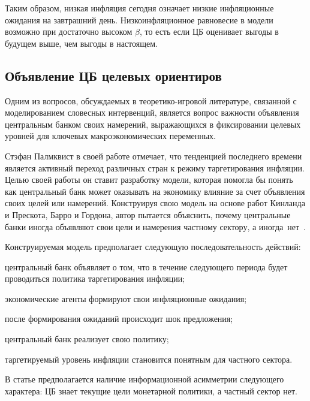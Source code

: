 \documentclass[14pt,a4paper, oneside]{extreport}
\renewenvironment{itemize}%
{\begin{list}{--} {%
\setlength{\parsep}{0em}%
\setlength{\itemsep}{0em}%
\setlength{\topsep}{0em}%
\setlength{\parskip}{0em}
}}%
{\end{list}}
\theoremstyle{plain}              %
\theoremstyle{definition}         %
\begin{document}
Таким образом, низкая инфляция сегодня означает низкие инфляционные ожидания на завтрашний день. Низкоинфляционное равновесие в модели возможно при достаточно высоком $\beta$, то есть если ЦБ оценивает выгоды в будущем выше, чем выгоды в настоящем. 

\subsection{Объявление ЦБ целевых ориентиров} 
Одним из вопросов, обсуждаемых в теоретико-игровой литературе, связанной с моделированием словесных интервенций, является вопрос важности объявления центральным банком своих намерений, выражающихся в фиксировании целевых уровней для ключевых макроэкономических переменных.   
  
Стэфан Палмквист в своей работе отмечает, что тенденцией последнего времени является активный переход различных стран к режиму таргетирования инфляции. Целью своей работы он ставит разработку модели, которая помогла бы понять как центральный банк может оказывать на экономику влияние за счет объявления своих целей или намерений. Конструируя свою модель на основе работ Кинланда и Прескота, Барро и Гордона, автор пытается объяснить, почему центральные банки иногда объявляют свои цели и намерения частному сектору, а иногда~нет~\cite{palmqvist1998central}.

Конструируемая модель предполагает следующую последовательность действий:

\begin{itemize}
\item центральный банк объявляет о том, что в течение следующего периода будет проводиться политика таргетирования инфляции;

\item экономические агенты формируют свои инфляционные ожидания;

\item после формирования ожиданий происходит  шок предложения;

\item центральный банк реализует свою политику;

\item таргетируемый уровень инфляции становится понятным для частного сектора.
\end{itemize}

В статье предполагается наличие информационной асимметрии следующего характера: ЦБ знает текущие цели монетарной политики, а частный сектор нет.
\end{document}
